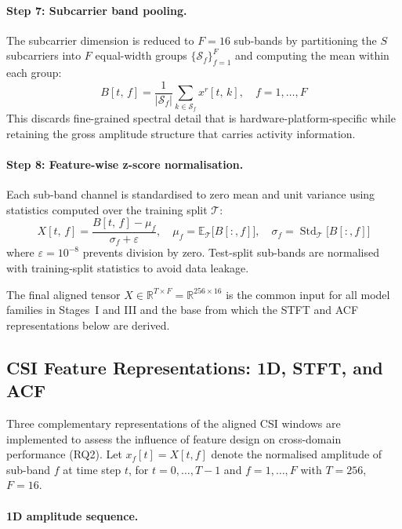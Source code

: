 \documentclass[english,bibtex]{kththesis}
\begin{document}
\paragraph{Step 7: Subcarrier band pooling.}
The subcarrier dimension is reduced to $F = 16$ sub-bands by partitioning the $S$ subcarriers into $F$ equal-width groups $\{\mathcal{S}_f\}_{f=1}^{F}$ and computing the mean within each group:
\begin{equation}
  B[t,\,f] = \frac{1}{|\mathcal{S}_f|}\sum_{k\in\mathcal{S}_f} x^r[t,\,k],\quad f = 1,\ldots,F
\end{equation}
This discards fine-grained spectral detail that is hardware-platform-specific while retaining the gross amplitude structure that carries activity information.

\paragraph{Step 8: Feature-wise z-score normalisation.}
Each sub-band channel is standardised to zero mean and unit variance using statistics computed over the training split $\mathcal{T}$:
\begin{equation}
  X[t,\,f] = \frac{B[t,\,f] - \mu_f}{\sigma_f + \varepsilon},\quad
  \mu_f = \mathbb{E}_{\mathcal{T}}\!\bigl[B[:,f]\bigr],\quad
  \sigma_f = \operatorname{Std}_{\mathcal{T}}\!\bigl[B[:,f]\bigr]
\end{equation}
where $\varepsilon = 10^{-8}$ prevents division by zero. Test-split sub-bands are normalised with training-split statistics to avoid data leakage.

The final aligned tensor $X \in \mathbb{R}^{T \times F} = \mathbb{R}^{256 \times 16}$ is the common input for all model families in Stages~I and III and the base from which the STFT and ACF representations below are derived.

\subsection{CSI Feature Representations: 1D, STFT, and ACF}
\label{sec:representations}

Three complementary representations of the aligned CSI windows are implemented to assess the influence of feature design on cross-domain performance (RQ2). Let $x_f[t] = X[t,f]$ denote the normalised amplitude of sub-band $f$ at time step $t$, for $t = 0,\ldots,T{-}1$ and $f = 1,\ldots,F$ with $T = 256$, $F = 16$.

\paragraph{1D amplitude sequence.}
\end{document}
